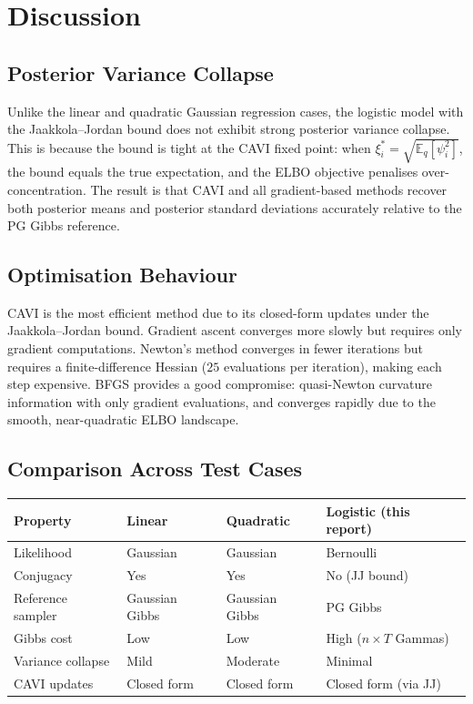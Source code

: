 \documentclass[11pt,a4paper]{article}
\newcommand{\E}{\mathbb{E}}
\begin{document}
\section{Discussion}

\subsection{Posterior Variance Collapse}

Unlike the linear and quadratic Gaussian regression cases, the logistic model with the
Jaakkola--Jordan bound does not exhibit strong posterior variance collapse.
This is because the bound is tight at the CAVI fixed point: when $\xi_i^* = \sqrt{\E_q[\psi_i^2]}$,
the bound equals the true expectation, and the ELBO objective penalises over-concentration.
The result is that CAVI and all gradient-based methods recover both posterior means and
posterior standard deviations accurately relative to the PG Gibbs reference.

\subsection{Optimisation Behaviour}

CAVI is the most efficient method due to its closed-form updates under the
Jaakkola--Jordan bound.
Gradient ascent converges more slowly but requires only gradient computations.
Newton's method converges in fewer iterations but requires a finite-difference Hessian
($25$ evaluations per iteration), making each step expensive.
BFGS provides a good compromise: quasi-Newton curvature information with only gradient
evaluations, and converges rapidly due to the smooth, near-quadratic ELBO landscape.

\subsection{Comparison Across Test Cases}

\begin{center}
\begin{tabular}{@{}llll@{}}
\toprule
Property & Linear & Quadratic & Logistic (this report) \\
\midrule
Likelihood & Gaussian & Gaussian & Bernoulli \\
Conjugacy & Yes & Yes & No (JJ bound) \\
Reference sampler & Gaussian Gibbs & Gaussian Gibbs & PG Gibbs \\
Gibbs cost & Low & Low & High ($n \times T$ Gammas) \\
Variance collapse & Mild & Moderate & Minimal \\
CAVI updates & Closed form & Closed form & Closed form (via JJ) \\
\bottomrule
\end{tabular}
\end{center}
\end{document}
